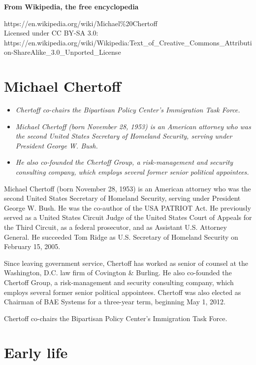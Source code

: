 \textbf{From Wikipedia, the free encyclopedia}

https://en.wikipedia.org/wiki/Michael\%20Chertoff\\
Licensed under CC BY-SA 3.0:\\
https://en.wikipedia.org/wiki/Wikipedia:Text\_of\_Creative\_Commons\_Attribution-ShareAlike\_3.0\_Unported\_License

\section{Michael Chertoff}\label{michael-chertoff}

\begin{itemize}
\item
  \emph{Chertoff co-chairs the Bipartisan Policy Center's Immigration
  Task Force.}
\item
  \emph{Michael Chertoff (born November 28, 1953) is an American
  attorney who was the second United States Secretary of Homeland
  Security, serving under President George W. Bush.}
\item
  \emph{He also co-founded the Chertoff Group, a risk-management and
  security consulting company, which employs several former senior
  political appointees.}
\end{itemize}

Michael Chertoff (born November 28, 1953) is an American attorney who
was the second United States Secretary of Homeland Security, serving
under President George W. Bush. He was the co-author of the USA PATRIOT
Act. He previously served as a United States Circuit Judge of the United
States Court of Appeals for the Third Circuit, as a federal prosecutor,
and as Assistant U.S. Attorney General. He succeeded Tom Ridge as U.S.
Secretary of Homeland Security on February 15, 2005.

Since leaving government service, Chertoff has worked as senior of
counsel at the Washington, D.C. law firm of Covington \& Burling. He
also co-founded the Chertoff Group, a risk-management and security
consulting company, which employs several former senior political
appointees. Chertoff was also elected as Chairman of BAE Systems for a
three-year term, beginning May 1, 2012.

Chertoff co-chairs the Bipartisan Policy Center's Immigration Task
Force.

\section{Early life}\label{early-life}

